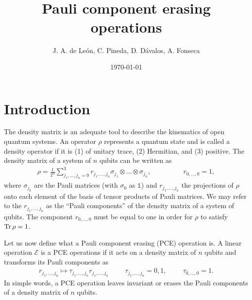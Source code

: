 \documentclass[11pt,dvipsnames]{article} %
\newcommand{\1}{\mathds{1}}
\begin{document}
\title{Pauli component erasing operations} 
\author{J. A. de León, C. Pineda, D. Dávalos, A. Fonseca}
\date{\today}  
\maketitle
{}

\section*{Introduction} %
The density matrix is an adequate tool to describe the kinematics 
of open quantum systems. An operator $\rho$ represents a quantum state and
is called a density operator if it is (1) of unitary trace, (2) Hermitian, and 
(3) positive. The density matrix of a system of $n$ qubits can be written as 
\begin{align}\label{eq:rho_nQubits_pauliBasis}
\rho =\frac{1}{2^n} \sum_{j_1,\ldots,j_n=0}^3r_{j_1,\ldots,j_n}
\sigma_{j_1}\otimes \ldots \otimes \sigma_{j_n},
\hspace{2cm} r_{0,\ldots,0}=1,
\end{align}
where $\sigma_{j_k}$ are the Pauli matrices (with $\sigma_0$ as $\1$)
and $r_{j_1,\ldots,j_n}$ the projections of $\rho$ onto each element of 
the basis of tensor products of Pauli matrices. We may refer to the 
$r_{j_1,\ldots,j_n}$ as the ``Pauli components'' of the density matrix 
of a system of qubits.  The component $r_{0,\ldots,0}$
must be equal to one in order for $\rho$ to satisfy $\Tr \rho =1$. 

Let us now define what a Pauli component erasing (PCE) operation is. 
A linear operation $\mathcal{E}$ is a PCE operations if it 
acts on a density matrix of $n$ qubits and transforms its Pauli components as
\begin{align}\label{eq:PCE-definition}
r_{j_1,\ldots,j_n} \longmapsto \tau_{j_1,\ldots,j_n}r_{j_1,\ldots,j_n}
\hspace{1cm} \tau_{j_1,\ldots,j_n}=0,1,
\hspace{1cm} \tau_{0,\ldots,0}=1.
\end{align}
In simple words, a PCE operation leaves invariant or erases the Pauli 
components of a density matrix of $n$ qubits.
\end{document}

